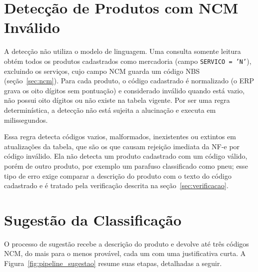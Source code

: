 \section{Detecção de Produtos com NCM Inválido}

A detecção não utiliza o modelo de linguagem. Uma consulta somente leitura obtém todos os produtos cadastrados como mercadoria (campo \texttt{SERVICO = 'N'}), excluindo os serviços, cujo campo NCM guarda um código NBS (seção~\ref{sec:ncm}). Para cada produto, o código cadastrado é normalizado (o ERP grava os oito dígitos sem pontuação) e considerado inválido quando está vazio, não possui oito dígitos ou não existe na tabela vigente. Por ser uma regra determinística, a detecção não está sujeita a alucinação e executa em milissegundos.

Essa regra detecta códigos vazios, malformados, inexistentes ou extintos em atualizações da tabela, que são os que causam rejeição imediata da NF-e por código inválido. Ela não detecta um produto cadastrado com um código válido, porém de outro produto, por exemplo um parafuso classificado como pneu; esse tipo de erro exige comparar a descrição do produto com o texto do código cadastrado e é tratado pela verificação descrita na seção~\ref{sec:verificacao}.

\section{Sugestão da Classificação}
\label{sec:sugestao}

O processo de sugestão recebe a descrição do produto e devolve até três códigos NCM, do mais para o menos provável, cada um com uma justificativa curta. A Figura~\ref{fig:pipeline_sugestao} resume suas etapas, detalhadas a seguir.

